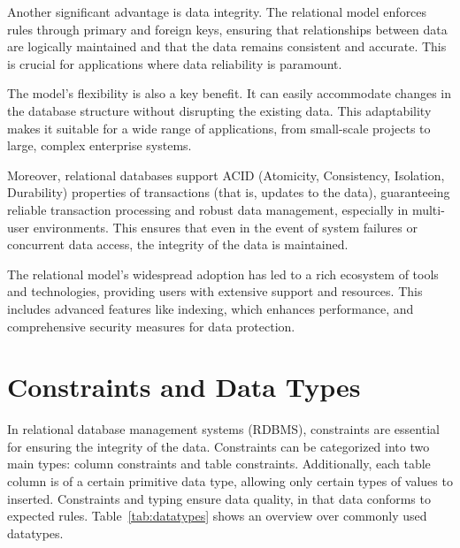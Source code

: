 Another significant advantage is data integrity. The relational model enforces rules through primary and foreign keys, ensuring that relationships between data are logically maintained and that the data remains consistent and accurate. This is crucial for applications where data reliability is paramount.

The model's flexibility is also a key benefit. It can easily accommodate changes in the database structure without disrupting the existing data. This adaptability makes it suitable for a wide range of applications, from small-scale projects to large, complex enterprise systems.

Moreover, relational databases support ACID (Atomicity, Consistency, Isolation, Durability) properties of transactions (that is, updates to the data), guaranteeing reliable transaction processing and robust data management, especially in multi-user environments. This ensures that even in the event of system failures or concurrent data access, the integrity of the data is maintained.

The relational model's widespread adoption has led to a rich ecosystem of tools and technologies, providing users with extensive support and resources. This includes advanced features like indexing, which enhances performance, and comprehensive security measures for data protection.

\section{Constraints and Data Types}

In relational database management systems (RDBMS), constraints are essential for ensuring the integrity of the data. Constraints can be categorized into two main types: column constraints and table constraints. Additionally, each table column is of a certain primitive data type, allowing only certain types of values to inserted. Constraints and typing ensure data quality, in that data conforms to expected rules. Table~\ref{tab:datatypes} shows an overview over commonly used datatypes. 

